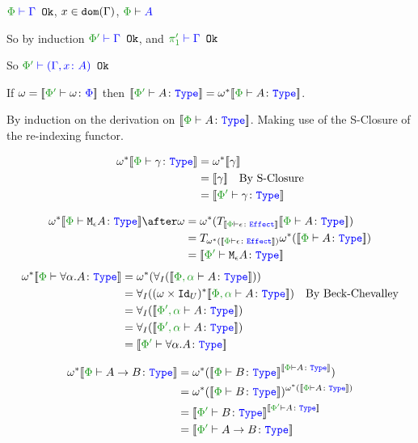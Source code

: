 \documentclass{report}
\begin{document}
    \bi $\wellformedok{\P}{\G}$, $x\in\texttt{dom}(\Gamma)$, $\wellformed{\P}{A}$

    So by induction $\wellformedok{\P'}{\G}$, and $\wellformedok{\p'}{\G}$

    So $\wellformedok{\P'}{(\gax)}$
    
If $\w = \deno{\typerelation{\P'}{\w}{\P}}$ then $\deno{\typerelation{\P'}{A}{\type}} = \w\star\deno{\typerelation{\P}{A}{\type}}$.
    
    \proof
    By induction on the derivation on $\deno{\typerelation{\P}{A}{\type}}$. Making use of the S-Closure of the re-indexing functor.
    
    \begin{align*}
        \w\star\deno{\typerelation{\P}{\g}{\type}} &= \w\star\deno{\g}\\
        & =  \deno{\g}\qt{By S-Closure}\\
        & = \deno{\typerelation{\P'}{\g}{\type}}
    \end{align*}
    
    \begin{align*}
        \w\star\deno{\typerelation{\P}{\mea}{\type}}\after\w & =  \w\star(\T{\deno{\typerelation{\P}{\e}{\effect}}}{\deno{\typerelation{\P}{A}{\type}}})\\
        &= \T{\w\star(\deno{\typerelation{\P}{\e}{\effect}})}{\w\star(\deno{\typerelation{\P}{A}{\type}})}\\
        & = \deno{\typerelation{\P'}{\mea}{\type}}
    \end{align*}
        \begin{align*}
            \w\star\deno{\typerelation{\P}{\all{\a}A}{\type}} & = \w\star(\allI(\deno{\typerelation{\P,\a}{A}{\type}}))\\
            & = \allI((\w\times\Id{U})\star\deno{\typerelation{\P,\a}{A}{\type}})\qt{By Beck-Chevalley}\\
            & = \allI(\deno{\typerelation{\P',\a}{A}{\type}})\\
            & = \allI(\deno{\typerelation{\P',\a}{A}{\type}})\\
            & = \deno{\typerelation{\P'}{\all{\a}{A}}{\type}}\\
        \end{align*}
    
    \begin{align*}
        \w\star\deno{\typerelation{\P}{\ab}{\type}} &= \w\star(\deno{\typerelation{\P}{B}{\type}}^{\deno{\typerelation{\P}{A}{\type}}})\\
        &=\w\star(\deno{\typerelation{\P}{B}{\type}})^{\w\star(\deno{\typerelation{\P}{A}{\type}})}\\
        & = \deno{\typerelation{\P'}{B}{\type}}^{\deno{\typerelation{\P'}{A}{\type}}}\\
        & = \deno{\typerelation{\P'}{\ab}{\type}}\\
    \end{align*}
\end{document}
